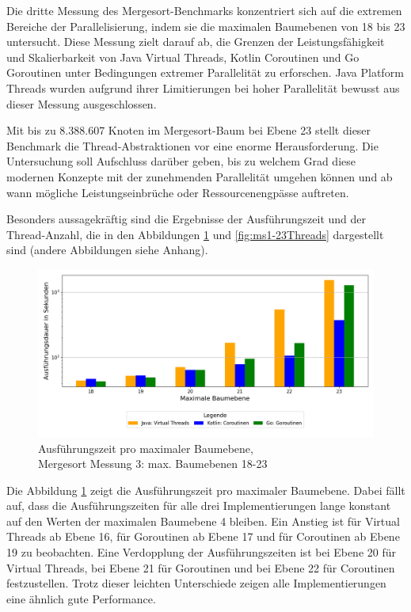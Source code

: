 \documentclass[fontsize=12pt,paper=a4,twoside=semi,parskip=half-,headsepline,headinclude]{scrreprt}
\begin{document}
Die dritte Messung des Mergesort-Benchmarks konzentriert sich auf die extremen Bereiche der Parallelisierung, indem sie die maximalen Baumebenen von 18 bis 23 untersucht. Diese Messung zielt darauf ab, die Grenzen der Leistungsfähigkeit und Skalierbarkeit von Java Virtual Threads, Kotlin Coroutinen und Go Goroutinen unter Bedingungen extremer Parallelität zu erforschen. Java Platform Threads wurden aufgrund ihrer Limitierungen bei hoher Parallelität bewusst aus dieser Messung ausgeschlossen.

Mit bis zu 8.388.607 Knoten im Mergesort-Baum bei Ebene 23 stellt dieser Benchmark die Thread-Abstraktionen vor eine enorme Herausforderung. Die Untersuchung soll Aufschluss darüber geben, bis zu welchem Grad diese modernen Konzepte mit der zunehmenden Parallelität umgehen können und ab wann mögliche Leistungseinbrüche oder Ressourcenengpässe auftreten.

Besonders aussagekräftig sind die Ergebnisse der Ausführungszeit und der Thread-Anzahl, die in den Abbildungen \ref{fig:ms1-23Zeit} und \ref{fig:ms1-23Threads} dargestellt sind (andere Abbildungen siehe Anhang).

\begin{figure}[H]
	\centering
	\includegraphics[scale=0.5]{figures/mergesort/Maximalebauebenen1-23_vcg/execution_time_plot.png}
	\caption{Ausführungszeit pro maximaler Baumebene,\\ Mergesort Messung 3: max. Baumebenen 18-23}
	\label{fig:ms1-23Zeit}
\end{figure}

Die Abbildung \ref{fig:ms1-23Zeit} zeigt die Ausführungszeit pro maximaler Baumebene. Dabei fällt auf, dass die Ausführungszeiten für alle drei Implementierungen lange konstant auf den Werten der maximalen Baumebene 4 bleiben. Ein Anstieg ist für Virtual Threads ab Ebene 16, für Goroutinen ab Ebene 17 und für Coroutinen ab Ebene 19 zu beobachten. Eine Verdopplung der Ausführungszeiten ist bei Ebene 20 für Virtual Threads, bei Ebene 21 für Goroutinen und bei Ebene 22 für Coroutinen festzustellen. Trotz dieser leichten Unterschiede zeigen alle Implementierungen eine ähnlich gute Performance.
\end{document}
